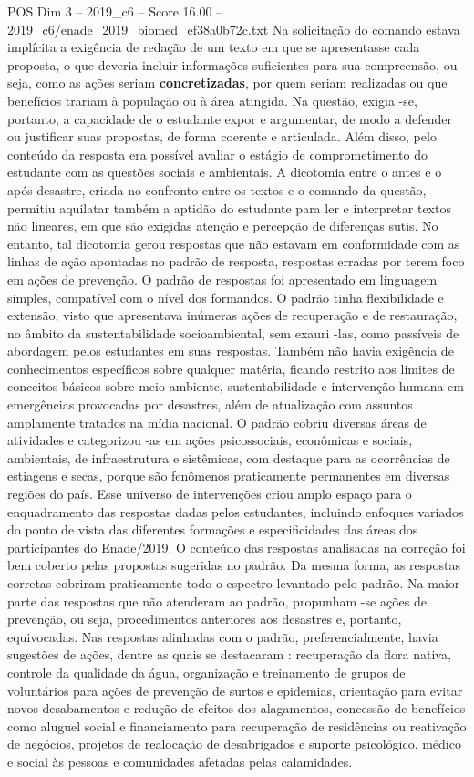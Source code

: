 \begin{textsample}{POS Dim 3 – 2019\_c6 – Score 16.00 – 2019\_c6/enade\_2019\_biomed\_ef38a0b72c.txt}
Na solicitação do comando estava implícita a exigência de redação de um texto em que se apresentasse cada proposta, o que deveria incluir informações suficientes para sua compreensão, ou seja, como as ações seriam \textbf{concretizadas}, por quem seriam realizadas ou que benefícios trariam à população ou à área atingida.
Na questão, exigia -se, portanto, a capacidade de o estudante expor e argumentar, de modo a defender ou justificar suas propostas, de forma coerente e articulada.
Além disso, pelo conteúdo da resposta era possível avaliar o estágio de comprometimento do estudante com as questões sociais e ambientais.
A dicotomia entre o antes e o após desastre, criada no confronto entre os textos e o comando da questão, permitiu aquilatar também a aptidão do estudante para ler e interpretar textos não lineares, em que são exigidas atenção e percepção de diferenças sutis.
No entanto, tal dicotomia gerou respostas que não estavam em conformidade com as linhas de ação apontadas no padrão de resposta, respostas erradas por terem foco em ações de prevenção.
O padrão de respostas foi apresentado em linguagem simples, compatível com o nível dos formandos.
O padrão tinha flexibilidade e extensão, visto que apresentava inúmeras ações de recuperação e de restauração, no âmbito da sustentabilidade socioambiental, sem exauri -las, como passíveis de abordagem pelos estudantes em suas respostas.
Também não havia exigência de conhecimentos específicos sobre qualquer matéria, ficando restrito aos limites de conceitos básicos sobre meio ambiente, sustentabilidade e intervenção humana em emergências provocadas por desastres, além de atualização com assuntos amplamente tratados na mídia nacional.
O padrão cobriu diversas áreas de atividades e categorizou -as em ações psicossociais, econômicas e sociais, ambientais, de infraestrutura e sistêmicas, com destaque para as ocorrências de estiagens e secas, porque são fenômenos praticamente permanentes em diversas regiões do país.
Esse universo de intervenções criou amplo espaço para o enquadramento das respostas dadas pelos estudantes, incluindo enfoques variados do ponto de vista das diferentes formações e especificidades das áreas dos participantes do Enade/2019.
O conteúdo das respostas analisadas na correção foi bem coberto pelas propostas sugeridas no padrão.
Da mesma forma, as respostas corretas cobriram praticamente todo o espectro levantado pelo padrão.
Na maior parte das respostas que não atenderam ao padrão, propunham -se ações de prevenção, ou seja, procedimentos anteriores aos desastres e, portanto, equivocadas.
Nas respostas alinhadas com o padrão, preferencialmente, havia sugestões de ações, dentre as quais se destacaram : recuperação da flora nativa, controle da qualidade da água, organização e treinamento de grupos de voluntários para ações de prevenção de surtos e epidemias, orientação para evitar novos desabamentos e redução de efeitos dos alagamentos, concessão de benefícios como aluguel social e financiamento para recuperação de residências ou reativação de negócios, projetos de realocação de desabrigados e suporte psicológico, médico e social às pessoas e comunidades afetadas pelas calamidades.

\end{textsample}
